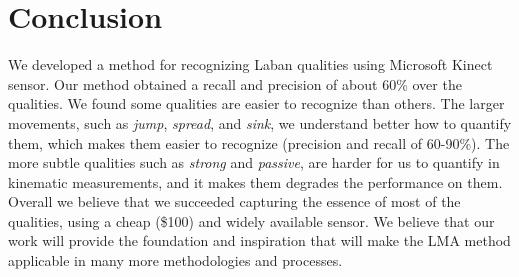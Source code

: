\documentclass[11pt,twocolumn,varwidth=true,a4paper,fleqn]{article}
\begin{document}
\section{Conclusion}
We developed a method for recognizing Laban qualities using Microsoft Kinect sensor. Our method obtained a recall and precision of about 60\% over the qualities. We found some qualities are easier to recognize than others. The larger movements, such as \textit{jump}, \textit{spread}, and \textit{sink}, we understand better how to quantify them, which makes them easier to recognize (precision and recall of 60-90\%). The more subtle qualities such as \textit{strong} and \textit{passive}, are harder for us to quantify in kinematic measurements, and it makes them degrades the performance on them. Overall we believe that we succeeded capturing the essence of most of the qualities, using a cheap (\$100) and widely available sensor.
We believe that our work will provide the foundation and inspiration that will make the LMA method
applicable in many more methodologies and processes.


\end{document}
